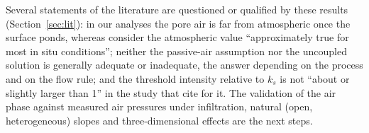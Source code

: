 Several statements of the literature are questioned or qualified by these results (Section~\ref{sec:lit}): in our
analyses the pore air is far from atmospheric once the surface ponds, whereas \citet{sheng2008} consider the
atmospheric value ``approximately true for most in situ conditions''; neither the passive-air assumption nor the
uncoupled solution is generally adequate or inadequate, the answer depending on the process and on the flow rule; and
the threshold intensity relative to $k_s$ is not ``about or slightly larger than 1'' in the study that
\citet{liu2021} cite for it. The validation of the air phase against measured air pressures under infiltration, natural (open, heterogeneous)
slopes and three-dimensional effects are the next steps.
